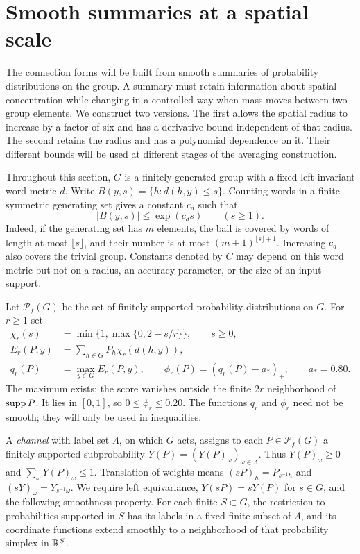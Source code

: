 \section{Smooth summaries at a spatial scale}
\label{sec:channels}

The connection forms will be built from smooth summaries of probability
distributions on the group.  A summary must retain information about spatial
concentration while changing in a controlled way when mass moves between two
group elements.  We construct two versions.  The first allows the spatial
radius to increase by a factor of six and has a derivative bound independent
of that radius.  The second retains the radius and has a polynomial dependence
on it.  Their different bounds will be used at different stages of the
averaging construction.

Throughout this section, $G$ is a finitely generated group with a fixed left
invariant word metric $d$.  Write $B(y,s)=\{h:d(h,y)\le s\}$.  Counting words
in a finite symmetric generating set gives a constant $c_d$ such that
\begin{equation}
 |B(y,s)|\le \exp(c_d s)\qquad(s\ge1).
 \label{ch:ball-growth}
\end{equation}
Indeed, if the generating set has $m$ elements, the ball is covered by words
of length at most $\lfloor s\rfloor$, and their number is at most
$(m+1)^{\lfloor s\rfloor+1}$.  Increasing $c_d$ also covers the trivial
group.  Constants denoted by $C$ may depend on this word metric but not on a
radius, an accuracy parameter, or the size of an input support.

Let $\mathcal P_f(G)$ be the set of finitely supported probability
distributions on $G$.  For $r\ge1$ set
\begin{equation}
 \begin{split}
 \chi_r(s)&=\min\{1,\max\{0,2-s/r\}\},\qquad s\ge0,\\
 E_r(P,y)&=\sum_{h\in G}P_h\chi_r(d(h,y)),\\
 q_r(P)&=\max_{y\in G}E_r(P,y),\qquad
 \phi_r(P)=(q_r(P)-a_*)_+,\qquad a_*=0.80.
 \end{split}
 \label{ch:concentration}
\end{equation}
The maximum exists: the score vanishes outside the finite $2r$ neighborhood
of $\operatorname{supp} P$.  It lies in $[0,1]$, so $0\le\phi_r\le0.20$.  The functions
$q_r$ and $\phi_r$ need not be smooth; they will only be used in inequalities.

\begin{definition}
\label{ch:channel-definition}
A \emph{channel} with label set $\Lambda$, on which $G$ acts, assigns to
each $P\in\mathcal P_f(G)$ a finitely supported subprobability
$Y(P)=(Y(P)_\omega)_{\omega\in\Lambda}$.  Thus $Y(P)_\omega\ge0$ and
$\sum_\omega Y(P)_\omega\le1$.  Translation of weights means
$(sP)_h=P_{s^{-1}h}$ and $(sY)_\omega=Y_{s^{-1}\omega}$.
We require left equivariance,
$Y(sP)=sY(P)$ for $s\in G$, and the following smoothness property.  For each
finite $S\subset G$, the restriction to probabilities supported in $S$ has
its labels in a fixed finite subset of $\Lambda$, and its coordinate
functions extend smoothly to a neighborhood of that probability simplex in
$\mathbb R^S$.
\end{definition}


